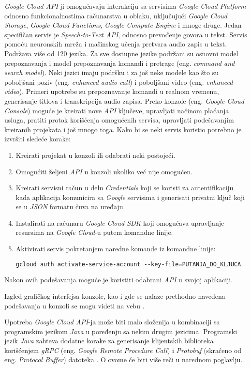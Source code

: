 \documentclass[android.tex]{subfiles}
\begin{document}
\textit{Google Cloud API}-ji omogućavaju interakciju sa servisima \textit{Google Cloud Platform} odnosno funkcionalnostima računarstva u oblaku, uključujući \textit{Google Cloud Storage}, \textit{Google Cloud Functions}, \textit{Google Compute Engine} i mnoge druge. Jedan specifičan servis je \textit{Speech-to-Text API}, odnosno prevođenje govora u tekst. Servis pomoću neuronskih mreža i mašinskog učenja pretvara audio zapis u tekst. Podržava više od 120 jezika. Za sve dostupne jezike podržani su osnovni model prepoznavanja i model prepoznavanja komandi i pretrage (eng. \textit{command and search model}). Neki jezici imaju podršku i za još neke modele kao što su poboljšani poziv (eng. \textit{enhanced audio call}) i poboljšani video (eng. \textit{enhanced video}). Primeri upotrebe su prepoznavanje komandi u realnom vremenu, generisanje titlova i transkripcija audio zapisa. Preko konzole (eng. \textit{Google Cloud Console}) moguće je kreirati nove \textit{API} ključeve, upravljati načinom plaćanja usluga, pratiti protok korišćenja omogućenih servisa, upravljati podešavanjim kreiranih projekata i još mnogo toga. Kako bi se neki servis koristio potrebno je izvršiti sledeće korake: 
\begin{enumerate}
    \item Kreirati projekat u konzoli ili odabrati neki postojeći.
    \item Omogućiti željeni \textit{API} u konzoli ukoliko već nije omogućen. 
    \item Kreirati servisni račun u delu \textit{Credentials} koji se koristi za autentifikaciju kada aplikacija komunicira sa \textit{Google} servisima i generisati privatni ključ koji se u \textit{JSON} formatu čuva na uređaju.
    \item Instalirati na računaru \textit{Google Cloud SDK} koji omogućava upravljanje resursima na \textit{Google Cloud}-u putem komandne linije.
    \item Aktivirati servis pokretanjem naredne komande iz komandne linije:
    
    \verb|gcloud auth activate-service-account --key-file=PUTANJA_DO_KLJUCA|
\end{enumerate}
Nakon ovih podešavanja moguće je koristiti odabrani \textit{API} u svojoj aplikaciji.

Izgled grafičkog interfejsa  konzole, kao i gde se nalaze prethodno navedena podešavanja u konzoli se mogu videti na vebu \cite{sajt:googleConsole}.

Upotreba \textit{Google Cloud API}-ja može biti malo složenija u kombinaciji sa programskim jezikom \textit{Java} u poređenju sa nekim drugim jezicima. Programski jezik \textit{Java} zahteva dodatne korake za generisanje klijentskih biblioteka korišćenjem \textit{gRPC} (eng. \textit{Google Remote Procedure Call}) \cite{sajt:grpc} i \textit{Protobuf} (skraćeno od eng. \textit{Protocol Buffer}) datoteka \cite{sajt:protobufDev}. O ovome će biti više reči u narednom poglavlju.
\end{document}
